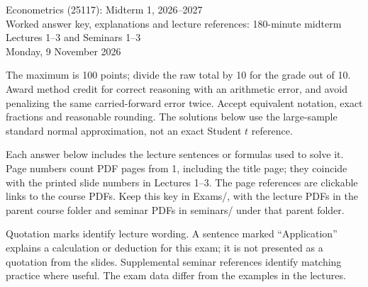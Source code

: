 \documentclass[a4paper,11pt,twoside]{article}
\begin{document}
\begin{center}
{\fontsize{12}{14}\selectfont Econometrics (25117): Midterm 1, 2026--2027}\\
Worked answer key, explanations and lecture references: 180-minute midterm\\
Lectures 1--3 and Seminars 1--3\\
\normalsize Monday, 9 November 2026
\end{center}

The maximum is 100 points; divide the raw total by 10 for the grade out of 10.
Award method credit for correct reasoning with an arithmetic error, and avoid
penalizing the same carried-forward error twice. Accept equivalent notation,
exact fractions and reasonable rounding. The solutions below use the
large-sample standard normal approximation, not an exact Student $t$ reference.

Each answer below includes the lecture sentences or formulas used to solve it.
Page numbers count PDF pages from 1, including the title page; they coincide
with the printed slide numbers in Lectures 1--3. The page references are
clickable links to the course PDFs. Keep this key in \textnormal{Exams/}, with the
lecture PDFs in the parent course folder and seminar PDFs in
\textnormal{seminars/} under that parent folder.

Quotation marks identify lecture wording. A sentence marked ``Application''
explains a calculation or deduction for this exam; it is not presented as a
quotation from the slides. Supplemental seminar references identify matching
practice where useful. The exam data differ from the examples in the lectures.
\end{document}
